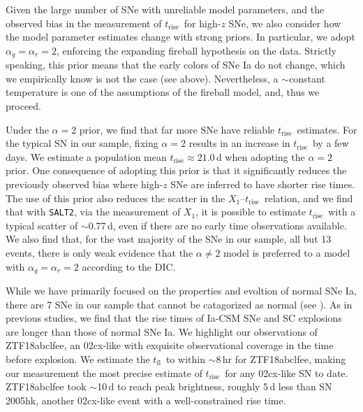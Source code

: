 \documentclass[twocolumn]{./aastex63}
\newcommand{\tfl}{$t_\mathrm{fl}$}
\newcommand{\trise}{$t_\mathrm{rise}$}
\begin{document}
Given the large number of SNe with unreliable model parameters, and the observed
bias in the measurement of \trise\ for high-$z$ SNe, we also consider how the
model parameter estimates change with strong priors. In particular, we adopt
$\alpha_g = \alpha_r = 2$, enforcing the expanding fireball hypothesis on the
data. Strictly speaking, this prior means that the early colors of SNe Ia do not
change, which we empirically know is not the case (see above). Nevertheless, a
$\sim$constant temperature is one of the assumptions of the fireball model, and,
thus we proceed.

Under the $\alpha = 2$ prior, we find that far more SNe have reliable \trise\
estimates. For the typical SN in our sample, fixing $\alpha = 2$ results in an
increase in \trise\ by a few days. We estimate a population mean \trise$ \approx
21.0$\,d when adopting the $\alpha = 2$ prior. One consequence of adopting this
prior is that it significantly reduces the previously observed bias where
high-$z$ SNe are inferred to have shorter rise times. The use of this prior also
reduces the scatter in the $X_1$--\trise\ relation, and we find that with
\texttt{SALT2}, via the measurement of $X_1$, it is possible to estimate \trise\
with a typical scatter of $\sim$0.77\,d, even if there are no early time
observations available. We also find that, for the vast majority of the SNe in
our sample, all but 13 events, there is only weak evidence that the $\alpha \ne
2$ model is preferred to a model with $\alpha_g = \alpha_r = 2$ according to the
DIC.

While we have primarily focused on the properties and evoltion of normal SNe Ia,
there are 7 SNe in our sample that cannot be catagorized as normal (see
\citealt{Yao19}). As in previous studies, we find that the rise times of Ia-CSM
SNe and SC explosions are longer than those of normal SNe Ia. We highlight our
observations of ZTF18abclfee, an 02cx-like with exquisite observational coverage
in the time before explosion. We estimate the \tfl\ to within $\sim$8\,hr for
ZTF18abclfee, making our measurement the most precise estimate of \trise\ for
any 02cx-like SN to date. ZTF18abclfee took $\sim$10\,d to reach peak
brightness, roughly 5\,d less than SN\,2005hk, another 02cx-like event with a
well-constrained rise time.
\end{document}
